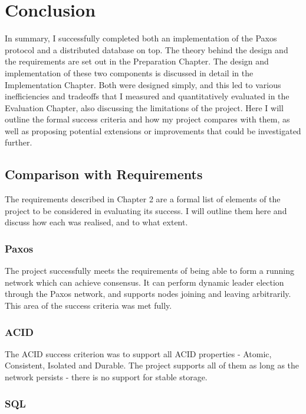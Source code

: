 \documentclass[12pt,twoside,notitlepage]{report}
\begin{document}
\cleardoublepage
\chapter{Conclusion}

In summary, I successfully completed both an implementation of the Paxos protocol and a
distributed database on top. The theory behind the design and the requirements are set out in the
Preparation Chapter. The design and implementation of these two components is discussed in detail
in the Implementation Chapter. Both were designed simply, and this led to various inefficiencies
and tradeoffs that I measured and quantitatively evaluated in the Evaluation Chapter, also
discussing the limitations of the project. Here I will outline the formal success criteria and how
my project compares with them, as well as proposing potential extensions or improvements that
could be investigated further.

\section{Comparison with Requirements}

The requirements described in Chapter 2 are a formal list of elements of the project to be
considered in evaluating its success. I will outline them here and discuss how each was realised,
and to what extent.

\subsection{Paxos}

The project successfully meets the requirements of being able to form a running network which can
achieve consensus. It can perform dynamic leader election through the Paxos network, and
supports nodes joining and leaving arbitrarily. This area of the success criteria was met fully.

\subsection{ACID}

The ACID success criterion was to support all ACID properties - Atomic, Consistent, Isolated and
Durable. The project supports all of them as long as the network persists - there is no support
for stable storage.

\subsection{SQL}
\end{document}

